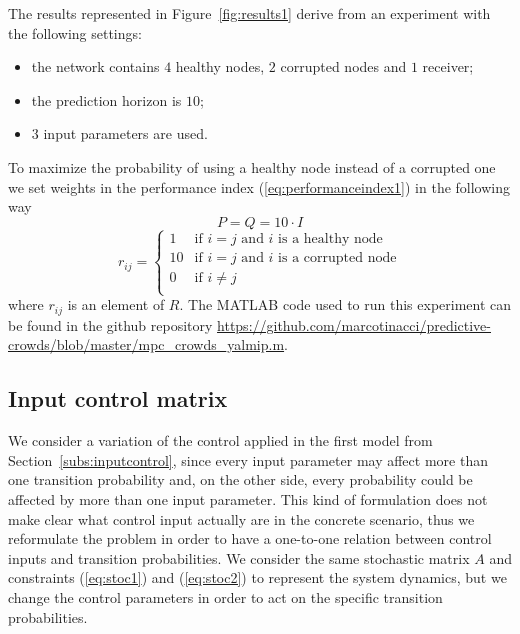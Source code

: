 \documentclass[a4paper, 11pt]{article}
\theoremstyle{definition}
\theoremstyle{remark}
\begin{document}
The results represented in Figure~\ref{fig:results1} derive from an experiment with the following settings: 
\begin{itemize}
	\item the network contains $4$ healthy nodes, $2$ corrupted nodes and $1$ receiver;
	\item the prediction horizon is $10$;
	\item $3$ input parameters are used.
\end{itemize}
To maximize the probability of using a healthy node instead of a corrupted one we set weights in the performance index (\ref{eq:performanceindex1}) in the following way
\begin{equation} \label{eq:pqmatrix}
	P = Q = 10 \cdot I
\end{equation}
\begin{equation} \label{eq:rmatrix}
	r_{ij} = 
	\begin{cases}
		1 & \mbox{if } i=j \mbox{ and $i$ is a healthy node} \\
		10 & \mbox{if } i=j \mbox{ and $i$ is a corrupted node} \\
		0 & \mbox{if } i\neq j \\
	\end{cases}
\end{equation}
where $r_{ij}$ is an element of $R$. The MATLAB code used to run this experiment can be found in the github repository \url{https://github.com/marcotinacci/predictive-crowds/blob/master/mpc_crowds_yalmip.m}.

\subsection{Input control matrix}
We consider a variation of the control applied in the first model from Section~\ref{subs:inputcontrol}, since every input parameter may affect more than one transition probability and, on the other side, every probability could be affected by more than one input parameter. This kind of formulation does not make clear what control input actually are in the concrete scenario, thus we reformulate the problem in order to have a one-to-one relation between control inputs and transition probabilities. We consider the same stochastic matrix $A$ and constraints (\ref{eq:stoc1}) and (\ref{eq:stoc2}) to represent the system dynamics, but we change the control parameters in order to act on the specific transition probabilities.
\end{document}
